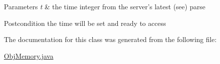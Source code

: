 \begin{DoxyParams}{Parameters}
{\em t} & the time integer from the server's latest (see) parse \\
\hline
\end{DoxyParams}
\begin{DoxyPostcond}{Postcondition}
the time will be set and ready to access 
\end{DoxyPostcond}


The documentation for this class was generated from the following file:\begin{DoxyCompactItemize}
\item 
\hyperlink{ObjMemory_8java}{ObjMemory.java}\end{DoxyCompactItemize}
